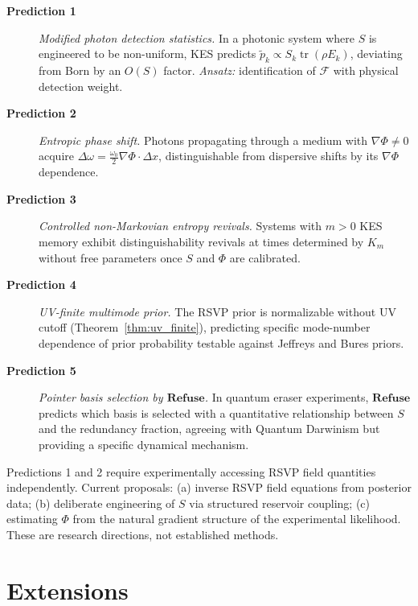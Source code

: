 \documentclass[11pt, openright, twoside]{book}
\theoremstyle{plain}
\theoremstyle{definition}
\theoremstyle{remark}
\newcommand{\Sfield}{S}
\newcommand{\Refuse}{\mathbf{Refuse}}
\begin{document}
\begin{description}
\item[\textbf{Prediction 1}] \textit{Modified photon detection statistics.} In a photonic
  system where $\Sfield$ is engineered to be non-uniform, KES predicts
  $\tilde p_k\propto\Sfield_k\operatorname{tr}(\rho E_k)$, deviating from Born by an
  $O(\Sfield)$ factor. \textit{Ansatz:} identification of $\mathcal{F}$ with physical
  detection weight.

\item[\textbf{Prediction 2}] \textit{Entropic phase shift.} Photons propagating through a
  medium with $\nabla\Phi\neq 0$ acquire $\Delta\omega=\frac{\omega_0}{2}\nabla\Phi\cdot\Delta x$,
  distinguishable from dispersive shifts by its $\nabla\Phi$ dependence.

\item[\textbf{Prediction 3}] \textit{Controlled non-Markovian entropy revivals.} Systems
  with $m>0$ KES memory exhibit distinguishability revivals at times determined by $K_m$
  without free parameters once $\Sfield$ and $\Phi$ are calibrated.

\item[\textbf{Prediction 4}] \textit{UV-finite multimode prior.} The RSVP prior is
  normalizable without UV cutoff (Theorem~\ref{thm:uv_finite}), predicting specific
  mode-number dependence of prior probability testable against Jeffreys and Bures priors.

\item[\textbf{Prediction 5}] \textit{Pointer basis selection by $\Refuse$.} In quantum eraser
  experiments, $\Refuse$ predicts which basis is selected with a quantitative relationship
  between $\Sfield$ and the redundancy fraction, agreeing with Quantum Darwinism but
  providing a specific dynamical mechanism.
\end{description}

\begin{epistbox}
Predictions 1 and 2 require experimentally accessing RSVP field quantities independently.
Current proposals: (a) inverse RSVP field equations from posterior data; (b) deliberate
engineering of $\Sfield$ via structured reservoir coupling; (c) estimating $\Phi$ from the
natural gradient structure of the experimental likelihood. These are research directions,
not established methods.
\end{epistbox}

\part{Extensions}
\end{document}
